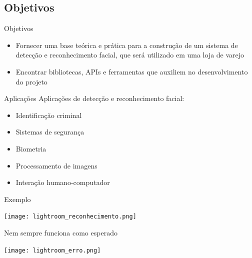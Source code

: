 \subsection{Objetivos}

\begin{frame}{Objetivos}
\begin{itemize}
    \item Fornecer uma base teórica e prática para a construção de um sistema de detecção e reconhecimento facial, que será utilizado em uma loja de varejo
    \item Encontrar bibliotecas, APIs e ferramentas que auxiliem no desenvolvimento do projeto
\end{itemize}
\end{frame}


\begin{frame}{Aplicações}
Aplicações de detecção e reconhecimento facial:
\medskip
\begin{itemize}
    \item Identificação criminal
    \item Sistemas de segurança
    \item Biometria
    \item Processamento de imagens
    \item Interação humano-computador
\end{itemize}
\end{frame}

\begin{frame}{Exemplo}
\centerline{\noindent\texttt{[image: lightroom\_reconhecimento.png]}}
\end{frame}

\begin{frame}{Nem sempre funciona como esperado}
\centerline{\noindent\texttt{[image: lightroom\_erro.png]}}
\end{frame}


